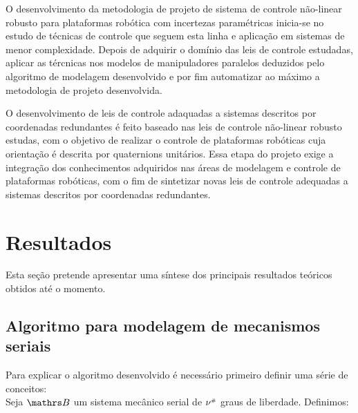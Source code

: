 \documentclass[a4paper,11pt,brazil,fleqn]{article}
\begin{document}
O desenvolvimento da metodologia de projeto de sistema de controle n\~ao-linear robusto para plataformas rob\'otica com incertezas param\'etricas inicia-se no estudo de t\'ecnicas de controle que seguem esta linha e aplica\c{c}\~ao em sistemas de menor complexidade. Depois de adquirir o dom\'inio das leis de controle estudadas, aplicar as t\'ercnicas nos modelos de manipuladores paralelos deduzidos pelo algoritmo de modelagem desenvolvido e por fim automatizar ao m\'aximo a metodologia de projeto desenvolvida.

O desenvolvimento de leis de controle adaquadas a sistemas descritos por coordenadas redundantes \'e feito baseado nas leis de controle n\~ao-linear robusto estudas, com o objetivo de realizar o controle de plataformas rob\'oticas cuja orienta\c{c}\~ao \'e descrita por quaternions unit\'arios. Essa etapa do projeto exige a integra\c{c}\~ao dos conhecimentos adquiridos nas \'areas de modelagem e controle de plataformas rob\'oticas, com o fim de sintetizar novas leis de controle adequadas a sistemas descritos por coordenadas redundantes.


\section{Resultados}\label{S04}

Esta se\c{c}\~ao pretende apresentar uma s\'intese dos principais resultados te\'oricos obtidos at\'e o momento.

\subsection{Algoritmo para modelagem de mecanismos seriais}\label{S04-1}

Para explicar o algoritmo desenvolvido \'e necess\'ario primeiro definir uma s\'erie de conceitos: \\

Seja $\ssB$ um sistema mec\^anico serial de $\nu^{\scriptscriptstyle \#}$ graus de liberdade. Definimos:
\end{document}
